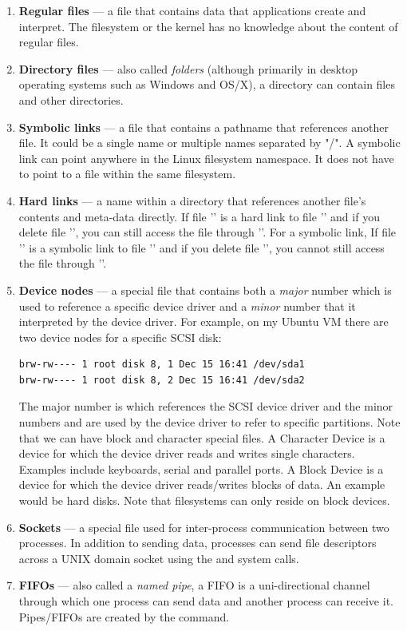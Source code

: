\begin{enumerate}
	\item \textbf{Regular files} --- a file that contains data that applications create and interpret. The filesystem 
		or the kernel has no knowledge about the content of regular files. 
	\item \textbf{Directory files} --- also called \textit{folders} (although primarily in desktop operating systems such
		as Windows and OS/X), a directory can contain files and other directories.
	\item \textbf{Symbolic links} --- a file that contains a pathname that references another file. It could be a 
		single name or multiple names separated by "/". A symbolic link can point anywhere in the Linux 
		filesystem namespace. It does not have to point to a file within the same filesystem.
	\item \textbf{Hard links} --- a name within a directory that references another file's contents and meta-data 
		directly. If file '' is a hard link to file '' and if you delete file '', you can still access the file through ''. For
		a symbolic link, If file '' is a symbolic link to file '' and if you delete file '', you cannot still access the 
		file through ''.
	\item \textbf{Device nodes} --- a special file that contains both a \textit{major} number which is used to
		reference a specific device driver and a \textit{minor} number that it interpreted by the device driver.
		For example, on my Ubuntu VM there are two device nodes for a specific SCSI disk:
		\begin{lstlisting}
brw-rw---- 1 root disk 8, 1 Dec 15 16:41 /dev/sda1
brw-rw---- 1 root disk 8, 2 Dec 15 16:41 /dev/sda2
\end{lstlisting}
		The major number is  which references the SCSI device driver and the minor numbers  
		and  are used by the device driver to refer to specific partitions. Note that we can have block 
		and character special files. A Character Device is a device for which the device driver reads and 
		writes single characters. Examples include keyboards, serial and parallel ports. A Block Device 
		is a device for which the device driver reads/writes blocks of data. An example would be hard 
		disks. Note that filesystems can only reside on block devices.
	\item \textbf{Sockets} --- a special file used for inter-process communication between two processes. 
		In addition to sending data, processes can send file descriptors across a UNIX domain socket 
		using the  and  system calls.
	\item \textbf{FIFOs}  --- also called a \textit{named pipe}, a FIFO is a uni-directional channel through
		which one process can send data and another process can receive it. Pipes/FIFOs are created
		by the  command.
\end{enumerate}

